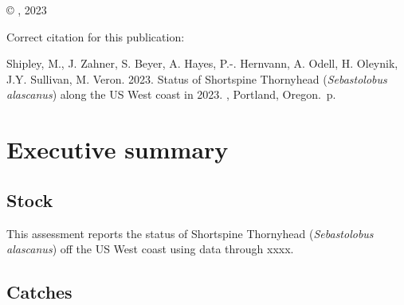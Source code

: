 \documentclass[11pt,
  english,
  letterpaper,
]{article}
\newcommand{\trTitle}{Status of Shortspine Thornyhead (\emph{Sebastolobus alascanus}) along the US West coast in 2023}
\newcommand{\trYear}{2023}
\newcommand{\trAuthsBack}{Shipley, M., J. Zahner, S. Beyer, A. Hayes, P.-. Hernvann, A. Odell, H. Oleynik, J.Y. Sullivan, M. Veron}
\newcommand{\trCitation}{
\begin{hangparas}{1em}{1}
\trAuthsBack{}. \trYear{}. \trTitle{}. \glsentrylong{pfmc}, Portland, Oregon. \pageref{LastPage}{}\,p.
\end{hangparas}}
\begin{document}
\thispagestyle{empty}
\vspace*{\fill}
\begin{center}
\copyright{} , \trYear{}\\
\end{center}
\par
\bigskip
\noindent
Correct citation for this publication:
\bigskip
\par
\trCitation{}
\clearpage


\tableofcontents\clearpage
\label{TRlastRoman}
\clearpage

\newpage
\thispagestyle{empty} %

\pagestyle{plain}  %
\renewcommand*{\thefootnote}{\arabic{footnote}}  %
\setcounter{footnote}{0}  %
\renewcommand{\headrulewidth}{0.5pt}
\renewcommand{\footrulewidth}{0.5pt}

\newcommand{\lt}{\ensuremath <}
\newcommand{\gt}{\ensuremath >}

\pagebreak
{}
\setcounter{page}{1}

\renewcommand{\thetable}{\roman{table}}
\renewcommand{\thefigure}{\roman{figure}}

\setlength\parskip{0.5em plus 0.1em minus 0.2em}

\hypertarget{executive-summary}{%
\section*{Executive summary}\label{executive-summary}}

\hypertarget{stock}{%
\subsection*{Stock}\label{stock}}

This assessment reports the status of Shortspine Thornyhead (\emph{Sebastolobus alascanus}) off the US West coast using data through xxxx.

\hypertarget{catches}{%
\subsection*{Catches}\label{catches}}
\end{document}
